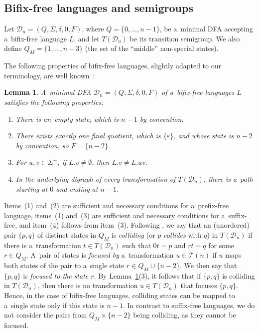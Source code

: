 \documentclass{amsart}
\newtheorem{lemma}[theorem]{Lemma}
\newcommand{\cD}{{\mathcal D}}
\newcommand{\cT}{{\mathcal T}}
\begin{document}
\subsection{Bifix-free languages and semigroups}

Let $\cD_n=(Q, \Sigma, \delta, 0,F)$, where $Q = \{0,\ldots,n-1\}$, be a~minimal DFA accepting a~bifix-free language $L$, and let $T(\cD_n)$ be its transition semigroup. We also define $Q_M = \{1,\ldots,n-3\}$ (the set of the ``middle'' non-special states).

The following properties of bifix-free languages, slightly adapted to our terminology, are well known~\cite{BLY12}:
\begin{lemma}\label{lem:bifix-free}
A~minimal DFA $\cD_n=(Q, \Sigma, \delta, 0,F)$ of a~bifix-free languages $L$ satisfies the following properties:
\begin{enumerate}
\item There is an~empty state, which is $n-1$ by convention.
\item There exists exactly one final quotient, which is $\{\varepsilon\}$, and whose state is $n-2$ by convention, so $F=\{n-2\}$.
\item For $u,v\in \Sigma^+$, if $L.v\neq \emptyset$, then $L.v\neq L.uv$.
\item In the underlying digraph of every transformation of $T(\cD_n)$, there is a~path starting at $0$ and ending at $n-1$.
\end{enumerate}
\end{lemma}
Items~(1) and~(2) are sufficient and necessary conditions for a~prefix-free language, items~(1) and~(3) are sufficient and necessary conditions for a~suffix-free, and item~(4) follows from item~(3).
Following \cite{BrSz15SyntacticComplexityOfSuffixFree}, we say that an (unordered) pair $\{p,q\}$ of distinct states in $Q_M$ is \emph{colliding} (or $p$ \emph{collides} with $q$) in $T(\cD_n)$ if there is a~transformation $t \in T(\cD_n)$ such that $0t = p$ and $rt = q$ for some $r \in Q_M$.
A~pair of states is \emph{focused by} a~transformation $u \in \cT(n)$ if $u$ maps both states of the pair to a~single state $r \in Q_M \cup \{n-2\}$.
We then say that $\{p,q\}$ is \emph{focused to the state $r$}.
By Lemma~\ref{lem:bifix-free}(3), it follows that if $\{p,q\}$ is colliding in $T(\cD_n)$, then there is no transformation $u \in T(\cD_n)$ that focuses $\{p,q\}$.
Hence, in the case of bifix-free languages, colliding states can be mapped to a~single state only if this state is $n-1$.
In contrast to suffix-free languages, we do not consider the pairs from $Q_M \times \{n-2\}$ being colliding, as they cannot be focused.
\end{document}
